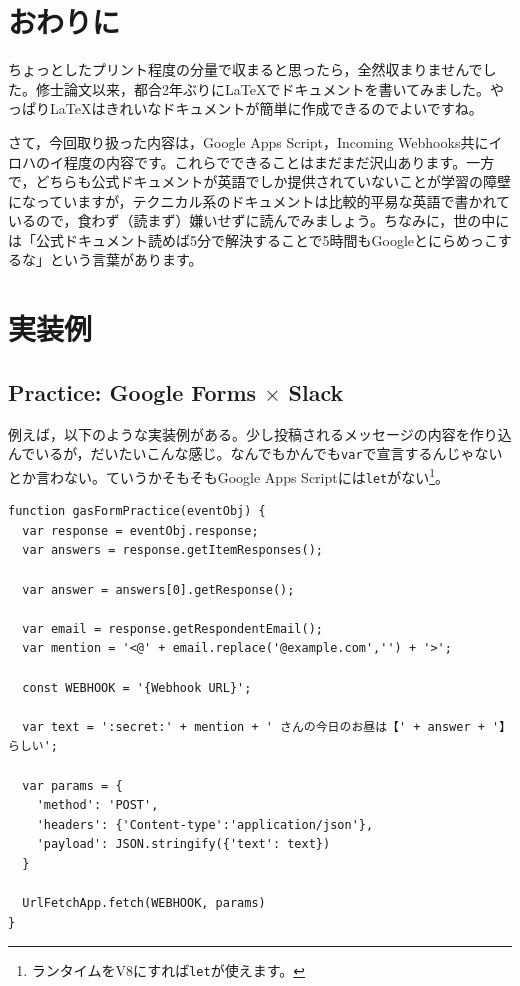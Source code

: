 \documentclass[uplatex,a4j]{jsarticle}
\begin{document}
\section{おわりに}


ちょっとしたプリント程度の分量で収まると思ったら，全然収まりませんでした。修士論文以来，都合2年ぶりに\LaTeX でドキュメントを書いてみました。やっぱり\LaTeX はきれいなドキュメントが簡単に作成できるのでよいですね。


さて，今回取り扱った内容は，Google Apps Script，Incoming Webhooks共にイロハのイ程度の内容です。これらでできることはまだまだ沢山あります。一方で，どちらも公式ドキュメントが英語でしか提供されていないことが学習の障壁になっていますが，テクニカル系のドキュメントは比較的平易な英語で書かれているので，食わず（読まず）嫌いせずに読んでみましょう。ちなみに，世の中には「公式ドキュメント読めば5分で解決することで5時間もGoogleとにらめっこするな」という言葉があります\footnotemark。

\clearpage
\appendix

\section{実装例}

\subsection{Practice: Google Forms $\times$ Slack}

例えば，以下のような実装例がある。少し投稿されるメッセージの内容を作り込んでいるが，だいたいこんな感じ。なんでもかんでも\verb|var|で宣言するんじゃないとか言わない。ていうかそもそもGoogle Apps Scriptには\verb|let|がない\footnote{ランタイムをV8にすれば\verb|let|が使えます。}。

\begin{lstlisting}[basicstyle=\ttfamily\footnotesize,frame=single,caption=Script Example for Forms practice]
function gasFormPractice(eventObj) {
  var response = eventObj.response;
  var answers = response.getItemResponses();
  
  var answer = answers[0].getResponse();
  
  var email = response.getRespondentEmail();
  var mention = '<@' + email.replace('@example.com','') + '>';
  
  const WEBHOOK = '{Webhook URL}';
  
  var text = ':secret:' + mention + ' さんの今日のお昼は【' + answer + '】らしい';
  
  var params = {
    'method': 'POST',
    'headers': {'Content-type':'application/json'},
    'payload': JSON.stringify({'text': text})
  }
  
  UrlFetchApp.fetch(WEBHOOK, params)
}
\end{lstlisting}
\end{document}
